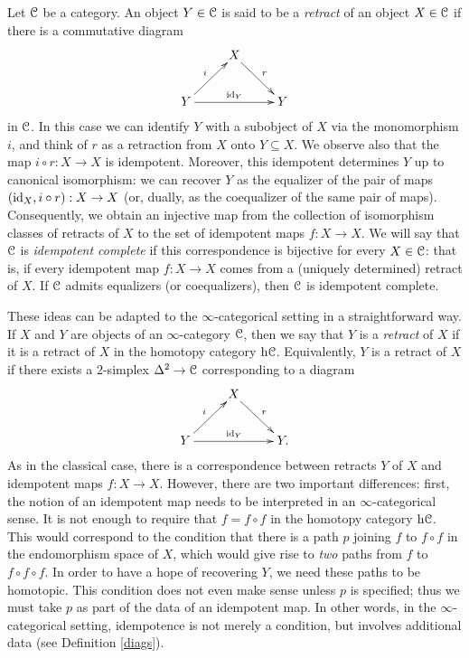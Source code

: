 Let $\operatorname{\mathcal{C}}$ be a category. An object $Y \in \operatorname{\mathcal{C}}$ is said to be a {\it retract} of an object $X \in \operatorname{\mathcal{C}}$ if there is a commutative diagram
$$ \xymatrix{ & X \ar[dr]^{r} & \\
Y \ar[rr]^{\id_{Y}} \ar[ur]^{i} & & Y}$$
in $\operatorname{\mathcal{C}}$. In this case we can identify $Y$ with a subobject of $X$ via the monomorphism $i$, and think of $r$ as a retraction from $X$ onto $Y \subseteq X$. We observe also that the map
$i \circ r: X \rightarrow X$ is idempotent. Moreover, this idempotent determines $Y$ up to canonical isomorphism: we can recover $Y$ as the equalizer of the pair of maps $(\operatorname{id}_{X}, i \circ r): X \rightarrow X$ (or, dually, as the coequalizer of the same pair of maps). Consequently, we obtain an injective map from the collection of isomorphism classes of retracts of $X$ to the set of idempotent maps $f: X \rightarrow X$. We will say that $\operatorname{\mathcal{C}}$ is {\it idempotent complete} if this correspondence is bijective for every $X \in \operatorname{\mathcal{C}}$: that is, if every idempotent map $f: X \rightarrow X$ comes from a (uniquely determined) retract of $X$. If $\operatorname{\mathcal{C}}$ admits equalizers (or coequalizers), then $\operatorname{\mathcal{C}}$ is 
idempotent complete.

These ideas can be adapted to the $\infty$-categorical setting in a straightforward way. If $X$ and $Y$ are objects of an $\infty$-category $\operatorname{\mathcal{C}}$, then we say that $Y$ is a {\it retract} of $X$ if it is a retract of $X$ in the homotopy category $\rm{h} \it{\operatorname{\mathcal{C}}}$. Equivalently, $Y$ is a retract of $X$ if there exists a $2$-simplex $\Delta^2 \rightarrow \operatorname{\mathcal{C}}$ corresponding to a diagram
$$ \xymatrix{ & X \ar[dr]^{r} & \\
Y \ar[rr]^{\id_{Y}} \ar[ur]^{i} & & Y.}$$
As in the classical case, there is a correspondence between retracts $Y$ of $X$ and idempotent maps $f: X \rightarrow X$. However, there are two important differences: first, the notion of an idempotent map needs to be interpreted in an $\infty$-categorical sense. It is not enough to require that $f = f \circ f$ in the homotopy category $\rm{h} \it{\operatorname{\mathcal{C}}}$. This would correspond to the condition that there is a path $p$ joining $f$ to $f \circ f$ in the endomorphism space of $X$, which would give rise to {\em two} paths from $f$ to $f \circ f \circ f$. In order to have a hope of recovering $Y$, we need these paths to be homotopic. This condition does not even make sense unless $p$ is specified; thus we must take $p$ as part of the data of an idempotent map. In other words, in the $\infty$-categorical setting, idempotence is not merely a condition, but involves additional data (see Definition \ref{diags}).

